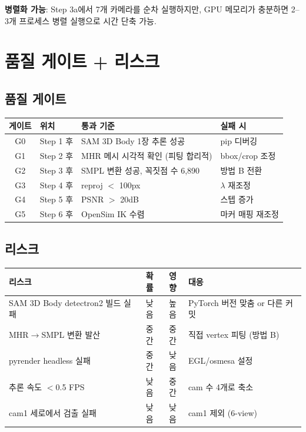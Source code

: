\documentclass[11pt, a4paper]{report}
\begin{document}
\begin{importantnote}
\textbf{병렬화 가능}: Step 3a에서 7개 카메라를 순차 실행하지만, GPU 메모리가 충분하면 2--3개 프로세스 병렬 실행으로 시간 단축 가능.
\end{importantnote}


\chapter{품질 게이트 + 리스크}

\section{품질 게이트}

\begin{center}
\renewcommand{\arraystretch}{1.3}
\begin{tabular}{clll}
\toprule
\textbf{게이트} & \textbf{위치} & \textbf{통과 기준} & \textbf{실패 시} \\
\midrule
G0 & Step 1 후 & SAM 3D Body 1장 추론 성공 & pip 디버깅 \\
G1 & Step 2 후 & MHR 메시 시각적 확인 (피팅 합리적) & bbox/crop 조정 \\
G2 & Step 3 후 & SMPL 변환 성공, 꼭짓점 수 6,890 & 방법 B 전환 \\
G3 & Step 4 후 & reproj $<$ 100px & $\lambda$ 재조정 \\
G4 & Step 5 후 & PSNR $>$ 20dB & 스텝 증가 \\
G5 & Step 6 후 & OpenSim IK 수렴 & 마커 매핑 재조정 \\
\bottomrule
\end{tabular}
\end{center}

\section{리스크}

\begin{center}
\renewcommand{\arraystretch}{1.3}
\begin{tabular}{p{4cm}ccp{4.5cm}}
\toprule
\textbf{리스크} & \textbf{확률} & \textbf{영향} & \textbf{대응} \\
\midrule
SAM 3D Body detectron2 빌드 실패 & 낮음 & 높음 & PyTorch 버전 맞춤 or 다른 커밋 \\
MHR$\to$SMPL 변환 발산 & 중간 & 중간 & 직접 vertex 피팅 (방법 B) \\
pyrender headless 실패 & 중간 & 낮음 & EGL/osmesa 설정 \\
추론 속도 $<$0.5 FPS & 낮음 & 중간 & cam 수 4개로 축소 \\
cam1 세로에서 검출 실패 & 낮음 & 낮음 & cam1 제외 (6-view) \\
\bottomrule
\end{tabular}
\end{center}
\end{document}
